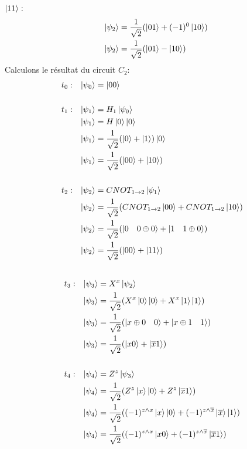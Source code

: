 \documentclass{article}
\begin{document}
$\ket{11}:$ \\
\begin{align*}
&&      \ket{\psi_2} &= \frac{1}{\sqrt{2}}(\ket{01} + (-1)^0\ket{10}) \\
&&      \ket{\psi_2} &= \frac{1}{\sqrt{2}}(\ket{01} - \ket{10})\\
\end{align*}
Calculons le résultat du circuit $C_2$:
\begin{align*}
&t_0:&  \ket{\psi_0} &= \ket{00} \\ \\
&t_1:&  \ket{\psi_1} &= H_1\ket{\psi_0} \\
&&      \ket{\psi_1} &= H\ket{0}\ket{0} \\
&&      \ket{\psi_1} &= \frac{1}{\sqrt{2}}(\ket{0} + \ket{1})\ket{0} \\
&&      \ket{\psi_1} &= \frac{1}{\sqrt{2}}(\ket{00} + \ket{10}) \\ \\
&t_2:&  \ket{\psi_2} &= CNOT_{1 \rightarrow 2}\ket{\psi_1} \\
&&      \ket{\psi_2} &= \frac{1}{\sqrt{2}}(CNOT_{1 \rightarrow 2}\ket{00} + CNOT_{1 \rightarrow 2}\ket{10}) \\
&&      \ket{\psi_2} &= \frac{1}{\sqrt{2}}(\ket{0 \quad 0 \oplus 0} + \ket{1 \quad 1 \oplus 0}) \\
&&      \ket{\psi_2} &= \frac{1}{\sqrt{2}}(\ket{00} + \ket{11}) \\ \\
\end{align*}
\begin{align*}
&t_3:&  \ket{\psi_3} &= X^x\ket{\psi_2} \\
&&      \ket{\psi_3} &= \frac{1}{\sqrt{2}}(X^x\ket{0}\ket{0} + X^x\ket{1}\ket{1}) \\
&&      \ket{\psi_3} &= \frac{1}{\sqrt{2}}(\ket{x \oplus 0 \quad 0} + \ket{x \oplus 1 \quad 1}) \\
&&      \ket{\psi_3} &= \frac{1}{\sqrt{2}}(\ket{x0} + \ket{\overline{x}1}) \\ \\
&t_4:&  \ket{\psi_4} &=  Z^z\ket{\psi_3} \\
&&      \ket{\psi_4} &= \frac{1}{\sqrt{2}}(Z^z\ket{x}\ket{0} + Z^z\ket{\overline{x}1}) \\
&&      \ket{\psi_4} &= \frac{1}{\sqrt{2}}((-1)^{z \wedge x}\ket{x}\ket{0} + (-1)^{z \wedge \overline{x}}\ket{\overline{x}}\ket{1}) \\
&&      \ket{\psi_4} &= \frac{1}{\sqrt{2}}((-1)^{z \wedge x}\ket{x0} + (-1)^{z \wedge \overline{x}}\ket{\overline{x}1}) \\
\end{align*}
\end{document}
